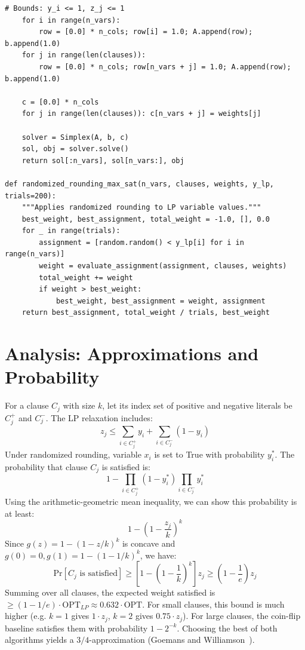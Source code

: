 \begin{lstlisting}[style=python, caption=Randomized Rounding for Max-SAT]
    # Bounds: y_i <= 1, z_j <= 1
    for i in range(n_vars):
        row = [0.0] * n_cols; row[i] = 1.0; A.append(row); b.append(1.0)
    for j in range(len(clauses)):
        row = [0.0] * n_cols; row[n_vars + j] = 1.0; A.append(row); b.append(1.0)
        
    c = [0.0] * n_cols
    for j in range(len(clauses)): c[n_vars + j] = weights[j]
    
    solver = Simplex(A, b, c)
    sol, obj = solver.solve()
    return sol[:n_vars], sol[n_vars:], obj

def randomized_rounding_max_sat(n_vars, clauses, weights, y_lp, trials=200):
    """Applies randomized rounding to LP variable values."""
    best_weight, best_assignment, total_weight = -1.0, [], 0.0
    for _ in range(trials):
        assignment = [random.random() < y_lp[i] for i in range(n_vars)]
        weight = evaluate_assignment(assignment, clauses, weights)
        total_weight += weight
        if weight > best_weight:
            best_weight, best_assignment = weight, assignment
    return best_assignment, total_weight / trials, best_weight
\end{lstlisting}

\section{Analysis: Approximations and Probability}
For a clause $C_j$ with size $k$, let its index set of positive and negative literals be $C_j^+$ and $C_j^-$. The LP relaxation includes:
\[
z_j \le \sum_{i \in C_j^+} y_i + \sum_{i \in C_j^-} (1 - y_i)
\]
Under randomized rounding, variable $x_i$ is set to True with probability $y_i^*$. The probability that clause $C_j$ is satisfied is:
\[
1 - \prod_{i \in C_j^+} (1 - y_i^*) \prod_{i \in C_j^-} y_i^*
\]
Using the arithmetic-geometric mean inequality, we can show this probability is at least:
\[
1 - \left(1 - \frac{z_j}{k}\right)^k
\]
Since $g(z) = 1 - (1 - z/k)^k$ is concave and $g(0) = 0, g(1) = 1 - (1 - 1/k)^k$, we have:
\[
\text{Pr}[C_j \text{ is satisfied}] \ge \left[1 - \left(1 - \frac{1}{k}\right)^k\right] z_j \ge \left(1 - \frac{1}{e}\right) z_j
\]
Summing over all clauses, the expected weight satisfied is $\ge (1 - 1/e) \cdot \text{OPT}_{LP} \approx 0.632 \cdot \text{OPT}$.
For small clauses, this bound is much higher (e.g. $k=1$ gives $1 \cdot z_j$, $k=2$ gives $0.75 \cdot z_j$). For large clauses, the coin-flip baseline satisfies them with probability $1 - 2^{-k}$. Choosing the best of both algorithms yields a $3/4$-approximation (Goemans and Williamson~\cite{goemans-williamson94}).

